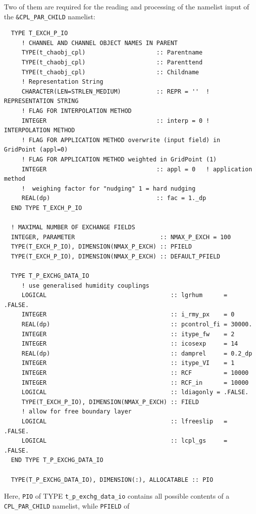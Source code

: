 \documentclass[11pt,twoside]{article}
\begin{document}
Two of them are required for the reading and processing of the  namelist input
of the \verb|&CPL_PAR_CHILD| namelist:
\begin{verbatim}
  TYPE T_EXCH_P_IO
     ! CHANNEL AND CHANNEL OBJECT NAMES IN PARENT  
     TYPE(t_chaobj_cpl)                    :: Parentname
     TYPE(t_chaobj_cpl)                    :: Parenttend
     TYPE(t_chaobj_cpl)                    :: Childname
     ! Representation String
     CHARACTER(LEN=STRLEN_MEDIUM)          :: REPR = ''  ! REPRESENTATION STRING
     ! FLAG FOR INTERPOLATION METHOD
     INTEGER                               :: interp = 0 ! INTERPOLATION METHOD
     ! FLAG FOR APPLICATION METHOD overwrite (input field) in GridPoint (appl=0)
     ! FLAG FOR APPLICATION METHOD weighted in GridPoint (1)
     INTEGER                               :: appl = 0   ! application method
     !  weighing factor for "nudging" 1 = hard nudging
     REAL(dp)                              :: fac = 1._dp
  END TYPE T_EXCH_P_IO

  ! MAXIMAL NUMBER OF EXCHANGE FIELDS
  INTEGER, PARAMETER                        :: NMAX_P_EXCH = 100
  TYPE(T_EXCH_P_IO), DIMENSION(NMAX_P_EXCH) :: PFIELD
  TYPE(T_EXCH_P_IO), DIMENSION(NMAX_P_EXCH) :: DEFAULT_PFIELD

  TYPE T_P_EXCHG_DATA_IO
     ! use generalised humidity couplings
     LOGICAL                                   :: lgrhum      = .FALSE.
     INTEGER                                   :: i_rmy_px    = 0
     REAL(dp)                                  :: pcontrol_fi = 30000.
     INTEGER                                   :: itype_fw    = 2 
     INTEGER                                   :: icosexp     = 14
     REAL(dp)                                  :: damprel     = 0.2_dp
     INTEGER                                   :: itype_VI    = 1 
     INTEGER                                   :: RCF         = 10000
     INTEGER                                   :: RCF_in      = 10000
     LOGICAL                                   :: ldiagonly = .FALSE.
     TYPE(T_EXCH_P_IO), DIMENSION(NMAX_P_EXCH) :: FIELD
     ! allow for free boundary layer
     LOGICAL                                   :: lfreeslip   = .FALSE.
     LOGICAL                                   :: lcpl_gs     = .FALSE.
  END TYPE T_P_EXCHG_DATA_IO

  TYPE(T_P_EXCHG_DATA_IO), DIMENSION(:), ALLOCATABLE :: PIO
\end{verbatim} 
Here, \verb|PIO| of TYPE \verb|t_p_exchg_data_io| contains all possible
contents of a \verb|CPL_PAR_CHILD| namelist, while \verb|PFIELD| of
\end{document}
